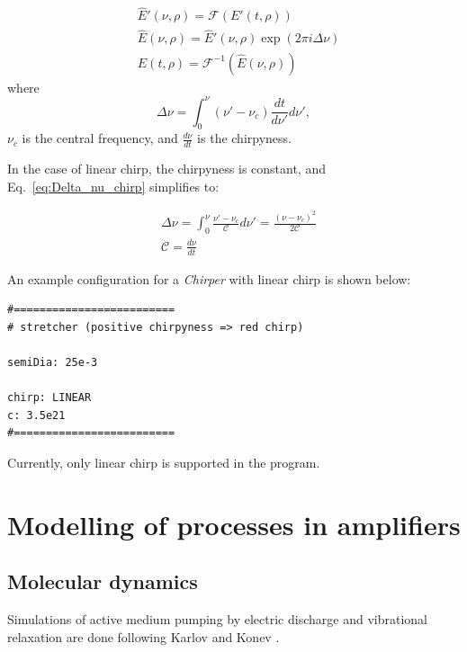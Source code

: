 \documentclass{report}
\begin{document}
\begin{equation}
\begin{aligned}
&\widehat{E}'(\nu,\rho) = \mathcal{F}(E'(t,\rho))\\
&\widehat{E}(\nu,\rho) = \widehat{E}'(\nu,\rho) \exp(2 \pi i \Delta\nu)\\
&E(t,\rho) = \mathcal{F}^{-1}(\widehat{E}(\nu,\rho))
\end{aligned}
\end{equation}
where 
\begin{equation}\label{eq:Delta_nu_chirp}
 \Delta \nu = \int_0^{\nu} (\nu'-\nu_c) \frac{dt}{d\nu'} d\nu',
\end{equation}
\(\nu_c\) is the central frequency, and \(\frac{d\nu}{dt}\) is the chirpyness.

In the case of linear chirp, the chirpyness is constant, and Eq.~\ref{eq:Delta_nu_chirp} simplifies to:

\begin{equation}
\begin{aligned}
&\Delta \nu = \int_0^{\nu} \frac{\nu'-\nu_c}{\mathcal{C}} d\nu' = \frac{(\nu-\nu_c)^2}{2\mathcal{C}}\\
&\mathcal{C} = \frac{d\nu}{dt}
\end{aligned}
\end{equation}

An example configuration for a \textit{Chirper} with linear chirp is shown below:

\begin{verbatim}
#=========================
# stretcher (positive chirpyness => red chirp)

semiDia: 25e-3

chirp: LINEAR
c: 3.5e21
#=========================
\end{verbatim}

Currently, only linear chirp is supported in the program.


\chapter{Modelling of processes in \texorpdfstring{}{CO2} amplifiers}\label{chapter:models}

\section{Molecular dynamics}
Simulations of active medium pumping by electric discharge and vibrational relaxation are done following Karlov and Konev  \cite{Karlov-1978}.
\end{document}

